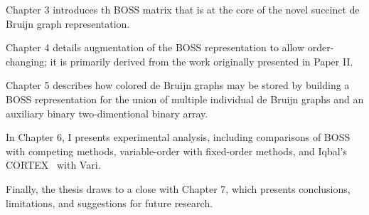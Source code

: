 Chapter 3 introduces th BOSS matrix that is at the core of the novel succinct de Bruijn graph representation. 

Chapter 4 details augmentation of the BOSS representation to allow order-changing; it is primarily derived from the work originally presented in Paper II. 

Chapter 5 describes how colored de Bruijn graphs may be stored by building a BOSS representation for the union of multiple individual de Bruijn graphs and an auxiliary binary two-dimentional binary array. 

In Chapter 6, I presents experimental analysis, including comparisons of BOSS with competing methods, variable-order with fixed-order methods, and Iqbal's CORTEX~\cite{ICTFM12}  %
with Vari.

Finally, the thesis draws to a close with Chapter 7, which presents conclusions, limitations, and suggestions for future research.